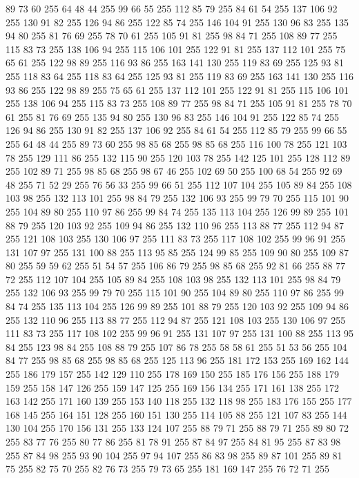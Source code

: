 89 73 60 255 64 48 44 255 99 66 55 255 112 85 79 255 84 61 54 255 137 106 92 255 130 91 82 255 126 94 86 255 122 85 74 255 146 104 91 255 130 96 83 255 135 94 80 255 81 76 69 255 78 70 61 255 105 91 81 255 98 84 71 255 108 89 77 255 115 83 73 255 138 106 94 255 115 106 101 255 122 91 81 255 137 112 101 255 75 65 61 255 122 98 89 255 116 93 86 255 163 141 130 255 119 83 69 255 125 93 81 255 118 83 64 255 118 83 64 255 125 93 81 255 119 83 69 255 163 141 130 255 116 93 86 255 122 98 89 255 75 65 61 255 137 112 101 255 122 91 81 255 115 106 101 255 138 106 94 255 115 83 73 255 108 89 77 255 98 84 71 255 105 91 81 255 78 70 61 255 81 76 69 255 135 94 80 255 130 96 83 255 146 104 91 255 122 85 74 255 126 94 86 255 130 91 82 255 137 106 92 255 84 61 54 255 112 85 79 255 99 66 55 255 64 48 44 255 89 73 60 255 98 85 68 255 98 85 68 255 116 100 78 255 121 103 78 255 129 111 86 255 132 115 90 255
120 103 78 255 142 125 101 255 128 112 89 255 102 89 71 255 98 85 68 255 98 67 46 255 102 69 50 255 100 68 54 255 92 69 48 255 71 52 29 255 76 56 33 255 99 66 51 255 112 107 104 255 105 89 84 255 108 103 98 255 132 113 101 255 98 84 79 255 132 106 93 255 99 79 70 255 115 101 90 255 104 89 80 255 110 97 86 255 99 84 74 255 135 113 104 255 126 99 89 255 101 88 79 255 120 103 92 255 109 94 86 255 132 110 96 255 113 88 77 255 112 94 87 255 121 108 103 255 130 106 97 255 111 83 73 255 117 108 102 255 99 96 91 255 131 107 97 255 131 100 88 255 113 95 85 255 124 99 85 255 109 90 80 255 109 87 80 255 59 59 62 255 51 54 57 255 106 86 79 255 98 85 68 255 92 81 66 255 88 77 72 255 112 107 104 255 105 89 84 255 108 103 98 255 132 113 101 255 98 84 79 255 132 106 93 255 99 79 70 255 115 101 90 255 104 89 80 255 110 97 86 255 99 84 74 255 135 113 104 255 126 99 89 255 101 88 79 255 120 103 92 255 109 94 86 255
132 110 96 255 113 88 77 255 112 94 87 255 121 108 103 255 130 106 97 255 111 83 73 255 117 108 102 255 99 96 91 255 131 107 97 255 131 100 88 255 113 95 84 255 123 98 84 255 108 88 79 255 107 86 78 255 58 58 61 255 51 53 56 255 104 84 77 255 98 85 68 255 98 85 68 255 125 113 96 255 181 172 153 255 169 162 144 255 186 179 157 255 142 129 110 255 178 169 150 255 185 176 156 255 188 179 159 255 158 147 126 255 159 147 125 255 169 156 134 255 171 161 138 255 172 163 142 255 171 160 139 255 153 140 118 255 132 118 98 255 183 176 155 255 177 168 145 255 164 151 128 255 160 151 130 255 114 105 88 255 121 107 83 255 144 130 104 255 170 156 131 255 133 124 107 255 88 79 71 255 88 79 71 255 89 80 72 255 83 77 76 255 80 77 86 255 81 78 91 255 87 84 97 255 84 81 95 255 87 83 98 255 87 84 98 255 93 90 104 255 97 94 107 255 86 83 98 255 89 87 101 255 89 81 75 255 82 75 70 255 82 76 73 255 79 73 65 255 181 169 147 255 76 72 71 255
